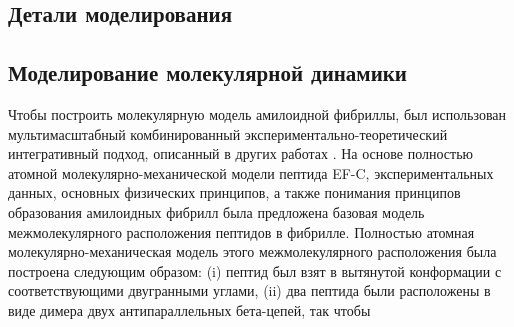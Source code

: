     
    
    
    
    
    
    
    
    
    
\subsection{Детали моделирования}

\subsection{Моделирование молекулярной динамики}

Чтобы построить молекулярную модель амилоидной фибриллы, был использован мультимасштабный комбинированный экспериментально-теоретический интегративный подход, описанный в других работах \cite{shaytan_self-assembling_2011,shaytan_self-organizing_2011}. На основе полностью атомной молекулярно-механической модели пептида EF-C, экспериментальных данных, основных физических принципов, а также понимания принципов образования амилоидных фибрилл была предложена базовая модель межмолекулярного расположения пептидов в фибрилле. Полностью атомная молекулярно-механическая модель этого межмолекулярного расположения была построена следующим образом: (i) пептид был взят в вытянутой конформации с соответствующими двугранными углами, (ii) два пептида были расположены в виде димера двух антипараллельных бета-цепей, так чтобы
